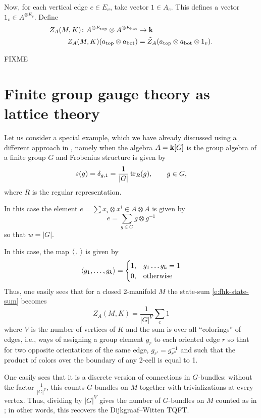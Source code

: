 Now, for each vertical edge $e\in E_v$, take vector $1\in A_e$. This
defines a vector $1_v\in A^{\otimes E_v}$. Define
\begin{equation}\label{e:fhk-state-sum4}
  \begin{aligned}
    Z_A(M,K)\colon A^{\otimes E_{\mathrm{top}}}\otimes A^{\otimes E_{\mathrm{bot}}}&\to \mathbf{k}\\
    Z_A(M,K) (a_{\mathrm{top}}\otimes a_{\mathrm{bot}})&=
            \tilde Z_A(a_{\mathrm{top}}\otimes a_{\mathrm{bot}} \otimes 1_v).
  \end{aligned}
\end{equation}

FIXME


\section{Finite group gauge theory as lattice theory}\label{s:lattice-gauge}
Let us consider a special example, which we have already discussed using a
different approach in , namely when the algebra $A=\mathbf{k}[G]$
is the group algebra of a finite group $G$ and Frobenius structure is given by
$$
  \varepsilon(g)=\delta_{g,1} = \frac{1}{|G|}\operatorname{tr}_R(g), \qquad g\in G,
$$
where $R$ is the regular representation.

In this case the element $e=\sum x_i\otimes x^i\in A\otimes A$ is given by
$$
  e=\sum_{g\in G}g\otimes g^{-1}
$$
so that $w=|G|$.

In this case, the map $\langle\, , \,\rangle$ is given by
$$
  \langle g_1, \dots, g_k\rangle=\begin{cases}
                 1, & g_1\dots g_k=1\\
               0, & \text{otherwise}
                   \end{cases}
$$
Thus, one easily sees that for a closed 2-manifold $M$
the state-sum \eqref{e:fhk-state-sum} becomes
$$
  Z_A(M,K)=\frac{1}{|G|^V} \sum_{c} 1
$$
where $V$ is the number of vertices of $K$ and  the sum is over all
``colorings'' of edges, i.e., ways of assigning a group element $g_r$ to each
oriented edge $r$ so that for two opposite orientations of the same edge,
$g_{r'}=g_{r''}^{-1}$ and such that the product of colors over the boundary of
any 2-cell is equal to 1.

One easily sees that it is a discrete version of connections in $G$-bundles:
without the factor $\frac{1}{|G|^V}$, this counts $G$-bundles on $M$ together
with trivializations at every vertex. Thus, dividing by $|G|^V$ gives
the number of $G$-bundles on $M$ counted as in ; in other words,
this recovers the Dijkgraaf--Witten TQFT.

